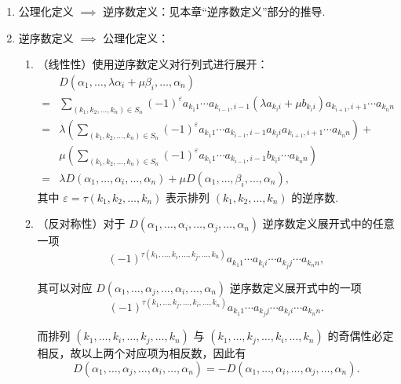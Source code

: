 \begin{exercise}
\begin{exgroup}
\begin{answer}
\begin{enumerate}
                \item 公理化定义 $\implies$ 逆序数定义：见本章``逆序数定义''部分的推导.

                \item 逆序数定义 $\implies$ 公理化定义：
                    \begin{enumerate}
                        \item （线性性）使用逆序数定义对行列式进行展开：
                            \begin{align*}
                                & D(\alpha_1, \ldots , \lambda\alpha_i + \mu\beta_i, \ldots, \alpha_n) \\
                                ={} & \sum_{(k_1, k_2, \ldots, k_n) \in S_n} (-1)^{\varepsilon} a_{k_1 1} \cdots a_{k_{i-1},i-1} (\lambda a_{k_i i} + \mu b_{k_i i}) a_{k_{i+1},i+1} \cdots a_{k_n n} \\
                                ={} & \lambda \left(\sum_{(k_1, k_2, \ldots, k_n) \in S_n} (-1)^{\varepsilon} a_{k_1 1} \cdots a_{k_{i-1},i-1} a_{k_i i} a_{k_{i+1},i+1} \cdots a_{k_n n} \right) + \\
                                 {} & \mu \left(\sum_{(k_1, k_2, \ldots, k_n) \in S_n} (-1)^{\varepsilon} a_{k_1 1} \cdots a_{k_{i-1},i-1} b_{k_i i} \cdots a_{k_n n}\right) \\
                                ={} & \lambda D(\alpha_1, \ldots, \alpha_i, \ldots, \alpha_n) + \mu D(\alpha_1, \ldots, \beta_i, \ldots, \alpha_n),
                            \end{align*}
                            其中 $\varepsilon = \tau(k_1, k_2, \ldots, k_n)$ 表示排列 $(k_1, k_2, \ldots, k_n)$ 的逆序数.

                        \item （反对称性）对于 $D(\alpha_1, \ldots, \alpha_i, \ldots, \alpha_j, \ldots, \alpha_n)$ 逆序数定义展开式中的任意一项
                            \[
                                (-1)^{\tau(k_1, \ldots, k_i, \ldots, k_j, \ldots, k_n)} a_{k_1 1} \cdots a_{k_i i} \cdots a_{k_j j} \cdots a_{k_n n},
                            \]

                            其可以对应 $D(\alpha_1, \ldots, \alpha_j, \ldots, \alpha_i, \ldots, \alpha_n)$ 逆序数定义展开式中的一项
                            \[
                                (-1)^{\tau(k_1, \ldots, k_j, \ldots, k_i, \ldots, k_n)} a_{k_1 1} \cdots a_{k_j j} \cdots a_{k_i i} \cdots a_{k_n n}.
                            \]

                            而排列 $(k_1, \ldots, k_i, \ldots, k_j, \ldots, k_n)$ 与 $(k_1, \ldots, k_j, \ldots, k_i, \ldots, k_n)$ 的奇偶性必定相反，故以上两个对应项为相反数，因此有
                            \[
                                D(\alpha_1, \ldots, \alpha_j, \ldots, \alpha_i, \ldots, \alpha_n) = -D(\alpha_1, \ldots, \alpha_i, \ldots, \alpha_j, \ldots, \alpha_n).
                            \]


\end{enumerate}
\end{enumerate}
\end{answer}
\end{exgroup}
\end{exercise}
